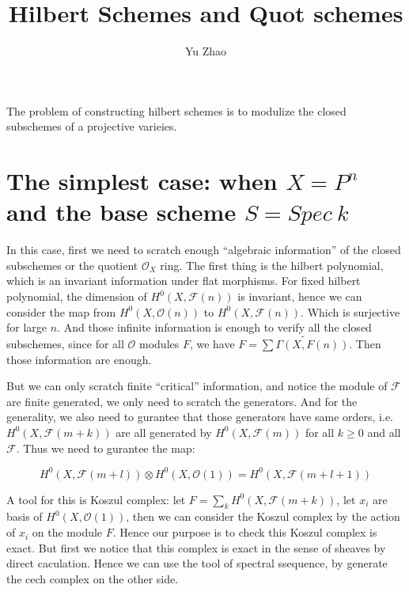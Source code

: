 \documentclass[12pt]{article}
\begin{document}


\title{Hilbert Schemes and Quot schemes}%
\author{Yu Zhao} %

\maketitle
The problem of constructing hilbert schemes is to modulize the closed subschemes of a projective varieies.
\section{The simplest case: when $X=P^{n}$ and the base scheme $S=Spec \ k$}
\label{sec:label}

In this case, first we need to scratch enough ``algebraic information'' of the closed subschemes or the quotient $\mathcal{O}_{X}$ ring. The first thing is the hilbert polynomial, which is an invariant information under flat morphisms. For fixed hilbert polynomial, the dimension of $H^0(X,\mathcal{F}(n))$ is invariant, hence we can consider the map from $H^0(X,\mathcal{O}(n))$ to $H^0(X,\mathcal{F}(n))$. Which is surjective for large $n$. And those infinite information is enough to verify all the closed subschemes, since for all $\mathcal{O}$ modules $F$, we have $F=\widetilde{\sum \Gamma(X, F(n))}$. Then those information are enough.

But we can only scratch finite ``critical'' information, and notice the module of $\mathcal{F}$ are finite generated, we only need to scratch the generators. And for the generality, we also need to gurantee that those generators have same orders, i.e. $H^0(X,\mathcal{F}(m+k))$ are all generated by $H^0(X,\mathcal{F}(m))$ for all $k \geq 0$ and all $\mathcal{F}$. Thus we need to gurantee the map:

\begin{displaymath}
  H^0(X,\mathcal{F}(m+l))\otimes H^0(X,\mathcal{O}(1))=  H^0(X,\mathcal{F}(m+l+1))
\end{displaymath}

A tool for this is Koszul complex: let $F=\sum_kH^0(X,\mathcal{F}(m+k))$, let $x_i$ are basis of $H^0(X,\mathcal{O}(1))$, then we can consider the Koszul complex by the action of $x_i$ on the module $F$. Hence our purpose is to check this Koszul complex is exact. But first we  notice that  this complex is exact in the sense of sheaves by direct caculation. Hence we can use the tool of spectral ssequence, by generate the cech complex on the other side. 
\end{document}
